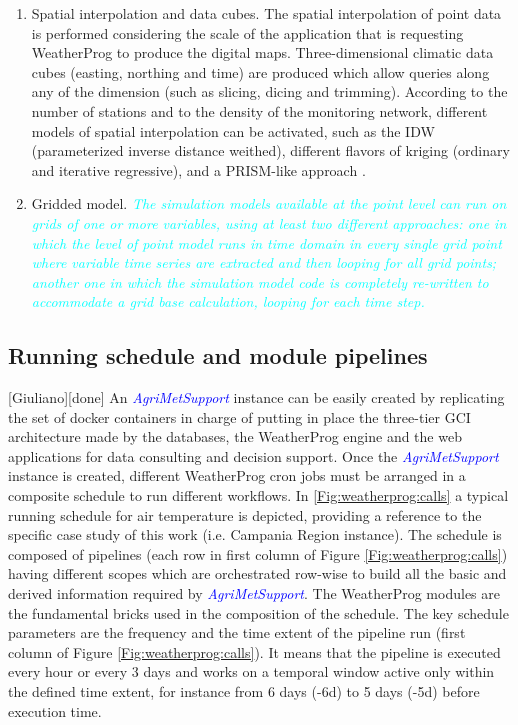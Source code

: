 \documentclass[authoryear,preprint,review,12pt]{elsarticle}
\newcommand{\update}[1]{\emph{\textcolor{blue}{#1}}}
\newcommand{\review}[1]{\emph{\textcolor{cyan}{#1}}}
\newcommand{\gci}{\update{AgriMetSupport}\xspace}
\begin{document}
\begin{enumerate}
    \item Spatial interpolation and data cubes. The spatial interpolation of point data is performed considering the scale of the application that is requesting WeatherProg to produce the digital maps.
    Three-dimensional climatic data cubes (easting, northing and time) are produced which allow queries along any of the dimension (such as slicing, dicing and trimming). According to the number of stations and to the density of the monitoring network, different models of spatial interpolation can be activated, such as the IDW (parameterized inverse distance weithed), different flavors of kriging (ordinary and iterative regressive), and a PRISM-like approach \citep{Daly08_PRISM_USA}.
    
    \item Gridded model. \review{ The simulation models available at the point level can run on grids of one or more variables, using at least two different approaches: one in which the level of point model runs in time domain in every single grid point where variable time series are extracted and then looping for all grid points; another one in which the simulation model code is completely re-written to accommodate a grid base calculation, looping for each time step. }
    
\end{enumerate}

\subsection{ Running schedule and module pipelines }[Giuliano][done]
An \gci instance can be easily created by replicating the set of docker containers in charge of putting in place the three-tier GCI architecture made by the databases, the WeatherProg engine and the web applications for data consulting and decision support.
Once the \gci instance is created, different WeatherProg cron jobs must be arranged in a composite schedule to run %
different workflows.
In \cref{Fig:weatherprog:calls} a typical running schedule for air temperature is depicted, providing a reference to the specific case study of this work (i.e. Campania Region instance).
The schedule is composed of pipelines (each row in first column of Figure \ref{Fig:weatherprog:calls}) having different scopes which are orchestrated row-wise to build all the basic and derived information required by \gci.
The WeatherProg modules are the fundamental bricks used in the composition of the schedule.
The key schedule parameters are the frequency and the time extent of the pipeline run (first column of Figure \ref{Fig:weatherprog:calls}).
It means that the pipeline is executed every hour or every 3 days and works on a temporal window active only within the defined time extent, for instance from 6 days (-6d) to 5 days (-5d) before execution time.
\end{document}
